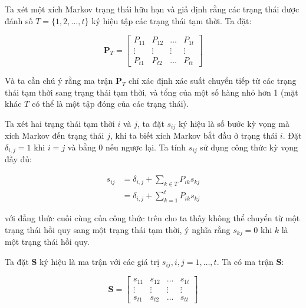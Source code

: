 \documentclass[14pt, a4paper]{article}
\numberwithin{equation}{section}
\numberwithin{figure}{section}
\theoremstyle{sltheorem}
\theoremstyle{soltheorem}
\numberwithin{dl}{section}
\numberwithin{md}{section}
\numberwithin{vd}{section}
\begin{document}
    Ta xét một xích Markov trạng thái hữu hạn và giả định rằng các trạng thái được đánh số $T=\lbrace 1, 2, \dots, t \rbrace$ ký hiệu tập các trạng thái tạm thời.
    Ta đặt:

    \begin{equation*}
        \mathbf{P}_T = \begin{bmatrix} P_{11} & P_{12} & \dots & P_{1t} \\ \vdots & \vdots & \vdots & \vdots \\ P_{t1} & P_{t2} & \dots & P_{tt}  \end{bmatrix}
    \end{equation*}

    Và ta cần chú ý rằng ma trận $\mathbf{P}_T$ chỉ xác định xác suất chuyển tiếp từ các trạng thái tạm thời sang trạng thái tạm thời, và tổng của một số hàng nhỏ hơn 1 (mặt khác $T$ có thể là một tập đóng của các trạng thái).
    
    Ta xét hai trạng thái tạm thời $i$ và $j$, ta đặt $s_{ij}$ ký hiệu là số bước kỳ vọng mà xích Markov đến trạng thái $j$, khi ta biết xích Markov bắt đầu ở trạng thái $i$.
    Đặt $\delta_{i,j}=1$ khi $i=j$ và bằng 0 nếu ngược lại.
    Ta tính $s_{ij}$ sử dụng công thức kỳ vọng đầy đủ:

    \begin{equation} \label{eq:expected_number_periods_i_to_j}
        \begin{aligned}
            s_{ij} &= \delta_{i,j} + \sum_{k \in T} P_{ik}s_{kj} \\
            &= \delta_{i,j} + \sum_{k=1}^t P_{ik} s_{kj}
        \end{aligned}
    \end{equation}

    với đẳng thức cuối cùng của công thức trên cho ta thấy không thể chuyển từ một trạng thái hồi quy sang một trạng thái tạm thời, ý nghĩa rằng $s_{kj}=0$ khi $k$ là một trạng thái hồi quy.

    Ta đặt $\mathbf{S}$ ký hiệu là ma trận với các giá trị $s_{ij}, i, j = 1, \dots, t$. Ta có ma trận $\mathbf{S}$:

    \begin{equation*}
        \mathbf{S} = \begin{bmatrix} s_{11} & s_{12} & \dots & s_{1t} \\ \vdots & \vdots & \vdots & \vdots \\ s_{t1} & s_{t2} & \dots & s_{tt}  \end{bmatrix}
    \end{equation*}
\end{document}
